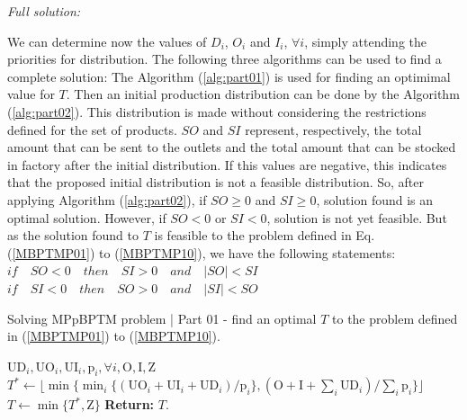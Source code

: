 \documentclass[10pt,fleqn,a4paper,twoside]{article}
\begin{document}
\noindent \emph{Full solution:} 

We can determine now the values of $D_i$, $O_i$ and $I_i$, $\forall i$, simply attending the priorities for distribution. The following three algorithms can be used to find a complete solution: The Algorithm (\ref{alg:part01}) is used for finding an optimimal value for $T$. Then an initial production distribution can be done by the Algorithm (\ref{alg:part02}). This distribution is made without considering the restrictions defined for the set of products. $SO$ and $SI$ represent, respectively, the total amount that can be sent to the outlets and the total amount that can be stocked in factory after the initial distribution. If this values are negative, this indicates that the proposed initial distribution is not a feasible distribution. So, after applying Algorithm (\ref{alg:part02}), if $SO \geq 0$ and $SI \geq 0$, solution found is an optimal solution. However, if $SO < 0$ or $SI <0$, solution is not yet feasible. But as the solution found to $T$ is feasible to the problem defined in Eq. (\ref{MBPTMP01}) to (\ref{MBPTMP10}), we have the following statements: \\

$if \quad SO < 0 \quad then \quad SI > 0 \quad and  \quad |SO| < SI$ \\

$if \quad SI < 0 \quad then \quad SO > 0 \quad and  \quad |SI| < SO$ \\

\begin{algorithm}[h!]
\caption{Solving MPpBPTM problem | Part 01 - find an optimal $T$ to the problem defined in (\ref{MBPTMP01}) to (\ref{MBPTMP10}).}\label{alg:part01}
\begin{algorithmic}
	\Require $\textrm{UD}_i, \textrm{UO}_i, \textrm{UI}_i, \textrm{p}_i, \forall i, \textrm{O}, \textrm{I}, \textrm{Z}$
	\State $T^* \gets \lfloor{\min \{\min_{i} \{(\textrm{UO}_i + \textrm{UI}_i + \textrm{UD}_i) / \textrm{p}_i\},(\textrm{O} + \textrm{I} + \sum_i \textrm{UD}_i) / \sum_i {\textrm{p}_i}\}}\rfloor$
	\State $T \gets \min \{T^* , \textrm{Z}\}$
\State \textbf{Return:} $T$.
\end{algorithmic}
\end{algorithm}
\end{document}
